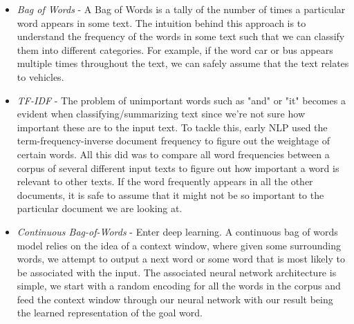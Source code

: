 \documentclass{article}
\begin{document}
\begin{itemize}
    \item \textit{Bag of Words} - A Bag of Words is a tally of the number of times a particular word appears in some text. The intuition behind this approach is to understand the frequency of the words in some text such that we can classify them into different categories. For example, if the word car or bus appears multiple times throughout the text, we can safely assume that the text relates to vehicles. \cite{doi:10.1080/00437956.1954.11659520}
    \item \textit{TF-IDF} - The problem of unimportant words such as "and" or "it" becomes a evident when classifying/summarizing text since we're not sure how important these are to the input text. To tackle this, early NLP used the term-frequency-inverse document frequency to figure out the weightage of certain words. All this did was to compare all word frequencies between a corpus of several different input texts to figure out how important a word is relevant to other texts. If the word frequently appears in all the other documents, it is safe to assume that it might not be so important to the particular document we are looking at. \cite{10.5555/106765.106782}
    \item \textit{Continuous Bag-of-Words} - Enter deep learning. A continuous bag of words model relies on the idea of a context window, where given some surrounding words, we attempt to output a next word or some word that is most likely to be associated with the input. The associated neural network architecture is simple, we start with a random encoding for all the words in the corpus and feed the context window through our neural network with our result being the learned representation of the goal word. \cite{mikolov2013efficient}


\end{itemize}
\end{document}
